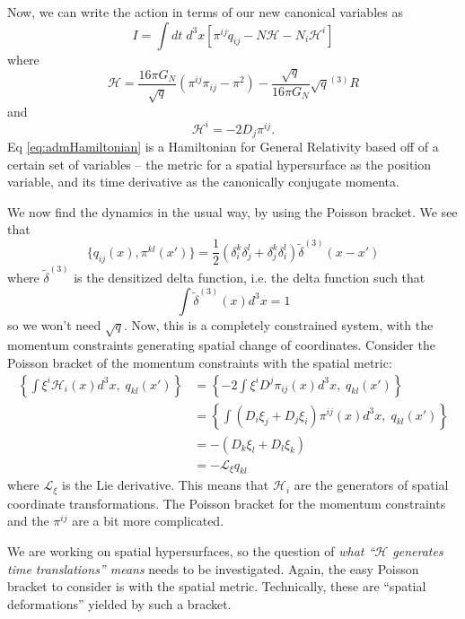 Now, we can write the action in terms of our new canonical
variables as
\begin{equation}%
I = \int dt\; d^{3}x \left[\pi^{ij}\dot{q}_{ij} - N\mathscr{H} - N_{i}\mathscr{H}^{i}\right]
\end{equation}
where
\begin{equation}\label{eq:admHamiltonian}
\mathscr{H} = \frac{16\pi
  G_{N}}{\sqrt{q}}\left(\pi^{ij}\pi_{ij}-\pi^{2}\right) -
\frac{\sqrt{q}}{16\pi G_{N}}\sqrt{q}{}^{(3)}R
\end{equation}
and
\begin{equation}%
\mathscr{H}^{i} = -2 D_{j}\pi^{ij}.
\end{equation}
Eq \eqref{eq:admHamiltonian} is a Hamiltonian for General
Relativity based off of a certain set of variables -- the metric
for a spatial hypersurface as the position variable, and its time
derivative as the canonically conjugate momenta.

We now find the dynamics in the usual way, by using the Poisson
bracket. We see that
\begin{equation}%
\{ q_{ij}(x), \pi^{kl}(x') \} = \frac{1}{2}\left(\delta^{k}_{i}\delta^{l}_{j}+\delta^{k}_{j}\delta^{l}_{i}\right)\tilde{\delta}^{(3)}(x-x')
\end{equation}
where $\widetilde{\delta}^{(3)}$ is the densitized delta
function, i.e. the delta function such that
\begin{equation}%
\int\tilde{\delta}^{(3)}(x)d^{3}x = 1
\end{equation}
so we won't need $\sqrt{q}$. Now, this is a completely
constrained system, with the momentum constraints generating
spatial change of coordinates. Consider the Poisson bracket of
the momentum constraints with the spatial metric:
\begin{subequations}
\begin{align}
\left\{\int\xi^{i}\mathscr{H}_{i}(x)d^{3}x,\; q_{kl}(x')\right\} &=  
\left\{-2\int\xi^{i}D^{j}\pi_{ij}(x)d^{3}x,\; q_{kl}(x')\right\}\\
&= \left\{\int(D_{i}\xi_{j}+D_{j}\xi_{i})\pi^{ij}(x)d^{3}x,\; q_{kl}(x')\right\}\\
&= -(D_{k}\xi_{l}+D_{l}\xi_{k})\\
&= -\mathscr{L}_{\xi}q_{kl}
\end{align}
\end{subequations}
where $\mathscr{L}_{\xi}$ is the Lie derivative. This means that
$\mathscr{H}_{i}$ are the generators of spatial coordinate
transformations. The Poisson bracket for the momentum constraints
and the $\pi^{ij}$ are a bit more complicated.

We are working on spatial hypersurfaces, so the question of \emph{what
``$\mathscr{H}$ generates time translations'' means} needs to be
investigated. Again, the easy Poisson bracket to consider is with
the spatial metric. Technically, these are ``spatial
deformations'' yielded by such a bracket.

